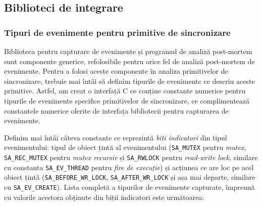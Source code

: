 \subsection{Biblioteci de integrare}
\label{integration-libraries}

\subsubsection{Tipuri de evenimente pentru primitive de sincronizare}

Biblioteca pentru capturare de evenimente și programul de analiză
post-mortem sunt componente generice, refolosibile pentru orice fel de
analiză post-mortem de evenimente. Pentru a folosi aceste componente în
analiza primitivelor de sincronizare, trebuie mai întâi să definim
tipurile de evenimente ce descriu aceste primitive. Astfel, am creat
o interfață C ce conține constante numerice pentru tipurile de
evenimente specifice primitivelor de sincronizare, ce complimentează
constantele numerice oferite de interfața bibliotecii pentru capturarea
de evenimente.

Definim mai întâi câteva constante ce reprezintă
\textit{biți indicatori} din tipul evenimentului: tipul de obiect
țintă al evenimentului (\lstinline{SA_MUTEX} pentru \textit{mutex},
\lstinline{SA_REC_MUTEX} pentru \textit{mutex recursiv} și
\lstinline{SA_RWLOCK} pentru \textit{read-write lock}, similare cu
constanta \lstinline{SA_EV_THREAD} pentru \textit{fire de execuție}) și
acțiunea ce are loc pe acel obiect țintă (\lstinline{SA_BEFORE_WR_LOCK},
\lstinline{SA_AFTER_WR_LOCK} și așa mai departe, similare cu
\lstinline{SA_EV_CREATE}). Lista completă a tipurilor de evenimente
capturate, împreună cu valorile acestora obținute din biții indicatori
este următoarea:

